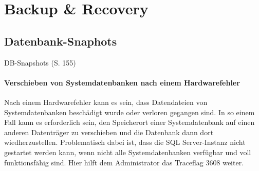   \chapter{Backup & Recovery}
    \setcounter{page}{1}
    \minitoc
\newpage

          
    \section{Datenbank-Snaphots}
  DB-Snapshots (S. 155)
          \subsubsection{Verschieben von Systemdatenbanken nach einem Hardwarefehler}
            Nach einem Hardwarefehler kann es sein, dass Datendateien von
            Systemdatenbanken beschädigt wurde oder verloren gegangen sind. In
            so einem Fall kann es erforderlich sein, den Speicherort einer
            Systemdatenbank auf einen anderen Datenträger zu verschieben und die
            Datenbank dann dort wiedherzustellen. Problematisch dabei ist, dass
            die SQL Server-Instanz nicht gestartet werden kann, wenn nicht alle
            Systemdatenbanken verfügbar und voll funktionsfähig sind. Hier hilft
            dem Administrator das Traceflag 3608 weiter.
